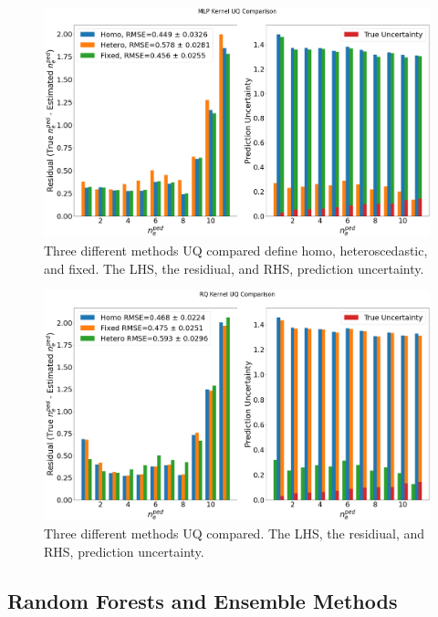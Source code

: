\documentclass[a4paper, twoside, final, 12pt]{article}
\begin{document}
{\begin{figure}\centering
		\includegraphics[scale=0.28]{./src/MLP_uq_compare}
		\caption{Three different methods UQ compared define homo, heteroscedastic, and fixed. The LHS, the residiual, and RHS, prediction uncertainty.}
	\label{fig:MLP_UQ}
\end{figure}\begin{figure}\centering
		\includegraphics[scale=0.28]{./src/RQ_uq_compare}
		\caption{Three different methods UQ compared. The LHS, the residiual, and RHS, prediction uncertainty.}
	\label{fig:RQ_UQ}
\end{figure}

\subsection{Random Forests and Ensemble Methods}

}
\end{document}
